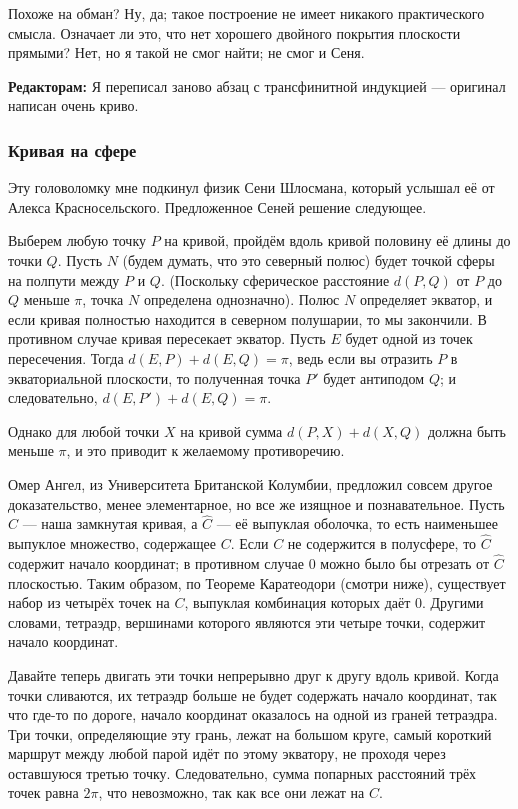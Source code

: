 Похоже на обман?
Ну, да; такое построение не имеет никакого практического смысла.
Означает ли это, что нет хорошего двойного покрытия плоскости прямыми?
Нет, но я такой не смог найти; не смог и Сеня.

\begin{addedbytheeditors}
\textbf{Редакторам:} Я переписал заново абзац с трансфинитной индукцией --- оригинал написан очень криво.
\end{addedbytheeditors}


\subsubsection*{Кривая на сфере}

Эту головоломку мне подкинул физик Сени Шлосмана, который услышал её от Алекса Красносельского.
Предложенное Сеней решение следующее.

Выберем любую точку $P$ на кривой, пройдём вдоль кривой половину её длины до точки $Q$.
Пусть $N$ (будем думать, что это северный полюс) будет точкой сферы на полпути между $P$ и $Q$.
(Поскольку сферическое расстояние $d(P, Q)$ от $P$ до $Q$ меньше $\pi$, точка $N$ определена однозначно).
Полюс $N$ определяет экватор, и если кривая полностью находится в северном полушарии, то мы закончили.
В противном случае кривая пересекает экватор.
Пусть $E$ будет одной из точек пересечения.
Тогда $d(E,P) + d(E,Q) = \pi$, ведь если вы отразить $P$ в экваториальной плоскости, то полученная точка $P'$ будет антиподом $Q$; и следовательно, $d(E, P') + d(E, Q) = \pi$.

Однако для любой точки $X$ на кривой сумма $d(P, X) + d(X, Q)$ должна быть меньше $\pi$, и это приводит к желаемому противоречию.

Омер Ангел, из Университета Британской Колумбии,
предложил совсем другое доказательство,
менее элементарное, но все же изящное и познавательное.
Пусть $C$ --- наша замкнутая кривая, а $\hat C$ --- её выпуклая оболочка, то есть наименьшее выпуклое множество, содержащее $C$.
Если $C$ не содержится в полусфере, то $\hat C$ содержит начало координат;
в противном случае $0$ можно было бы отрезать от $\hat C$ плоскостью.
Таким образом, по Теореме Каратеодори (смотри ниже), существует набор из четырёх точек на $C$, выпуклая комбинация которых даёт $0$.
Другими словами, тетраэдр, вершинами которого являются эти четыре точки, содержит начало координат.

Давайте теперь двигать эти точки непрерывно друг к другу вдоль кривой.
Когда точки сливаются, их тетраэдр больше не будет содержать начало координат, так что где-то по дороге, начало координат оказалось на одной из граней тетраэдра.
Три точки, определяющие эту грань, лежат на большом круге, самый короткий маршрут между любой парой идёт по этому экватору, не проходя через оставшуюся третью точку.
Следовательно, сумма попарных расстояний трёх точек равна $2\pi$, что невозможно, так как все они лежат на $C$.


